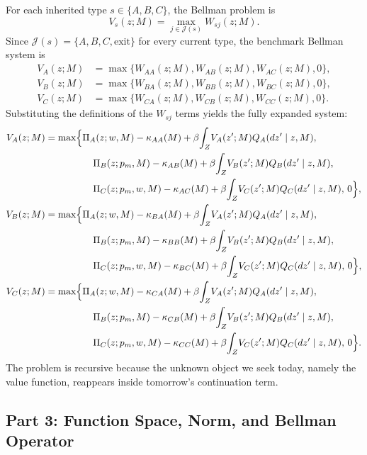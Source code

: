 For each inherited type $s\in\{A,B,C\}$, the Bellman problem is
\[
V_s(z;M)=\max_{j\in\mathcal J(s)}W_{sj}(z;M).
\]
Since $\mathcal J(s)=\{A,B,C,\mathrm{exit}\}$ for every current type, the benchmark Bellman system is
\begin{align*}
V_A(z;M)&=\max\{W_{AA}(z;M),W_{AB}(z;M),W_{AC}(z;M),0\},\\
V_B(z;M)&=\max\{W_{BA}(z;M),W_{BB}(z;M),W_{BC}(z;M),0\},\\
V_C(z;M)&=\max\{W_{CA}(z;M),W_{CB}(z;M),W_{CC}(z;M),0\}.
\end{align*}
Substituting the definitions of the $W_{sj}$ terms yields the fully expanded system:
\begin{align*}
V_A(z;M)
&=
\max\Bigl\{
\Pi_A(z;w,M)-\kappa_{AA}(M)+\beta\!\int_Z\!V_A(z';M)Q_A(dz'\mid z,M),\\
&\hspace{1.75cm}
\Pi_B(z;p_m,M)-\kappa_{AB}(M)+\beta\!\int_Z\!V_B(z';M)Q_B(dz'\mid z,M),\\
&\hspace{1.75cm}
\Pi_C(z;p_m,w,M)-\kappa_{AC}(M)+\beta\!\int_Z\!V_C(z';M)Q_C(dz'\mid z,M),\,0
\Bigr\},\\
V_B(z;M)
&=
\max\Bigl\{
\Pi_A(z;w,M)-\kappa_{BA}(M)+\beta\!\int_Z\!V_A(z';M)Q_A(dz'\mid z,M),\\
&\hspace{1.75cm}
\Pi_B(z;p_m,M)-\kappa_{BB}(M)+\beta\!\int_Z\!V_B(z';M)Q_B(dz'\mid z,M),\\
&\hspace{1.75cm}
\Pi_C(z;p_m,w,M)-\kappa_{BC}(M)+\beta\!\int_Z\!V_C(z';M)Q_C(dz'\mid z,M),\,0
\Bigr\},\\
V_C(z;M)
&=
\max\Bigl\{
\Pi_A(z;w,M)-\kappa_{CA}(M)+\beta\!\int_Z\!V_A(z';M)Q_A(dz'\mid z,M),\\
&\hspace{1.75cm}
\Pi_B(z;p_m,M)-\kappa_{CB}(M)+\beta\!\int_Z\!V_B(z';M)Q_B(dz'\mid z,M),\\
&\hspace{1.75cm}
\Pi_C(z;p_m,w,M)-\kappa_{CC}(M)+\beta\!\int_Z\!V_C(z';M)Q_C(dz'\mid z,M),\,0
\Bigr\}.
\end{align*}
The problem is recursive because the unknown object we seek today, namely the value function, reappears inside tomorrow's continuation term.

\subsection{Part 3: Function Space, Norm, and Bellman Operator}

